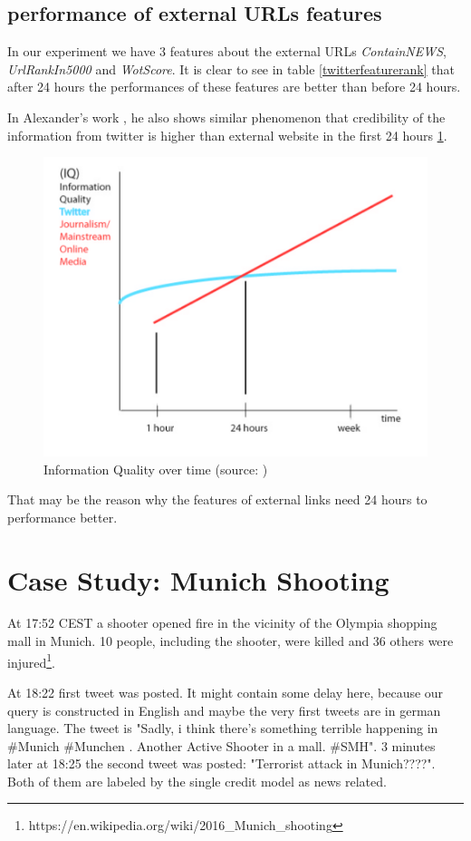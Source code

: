   \subsection{performance of external URLs features}
  In our experiment we have 3 features about the external URLs \emph{ContainNEWS}, \emph{UrlRankIn5000} and \emph{WotScore}. It is clear to see in table \ref{twitterfeaturerank} that after 24 hours the performances of these features are better than before 24 hours.    
  
  In Alexander's work \cite{mills2009web}, he also shows similar phenomenon that credibility of the information from twitter is higher than external website in the first 24 hours \ref{fig:informationqulitat}. 
  \begin{figure}[!h]
\centering
\includegraphics[width=0.7\columnwidth]{images/Informationqulitat.png}
\caption{Information Quality over time (source: \cite{mills2009web})}
\label{fig:informationqulitat}
\end{figure}
\newpage
That may be the reason why the features of external links need 24 hours to performance better.
 \section{Case Study: Munich Shooting } 
At 17:52 CEST a shooter opened fire in the vicinity of the Olympia shopping mall in Munich. 10 people, including the shooter, were killed and 36 others were injured\footnote{https://en.wikipedia.org/wiki/2016\_Munich\_shooting}. 

At 18:22 first tweet was posted. It might contain some delay here, because our query is constructed in English and maybe the very first tweets are in german language. The tweet is "Sadly, i think there's something terrible happening in \#Munich \#Munchen .  Another Active Shooter in a mall. \#SMH". 3 minutes later at 18:25 the second tweet was posted: "Terrorist attack in Munich????". Both of them are labeled by the single credit model as news related.  

